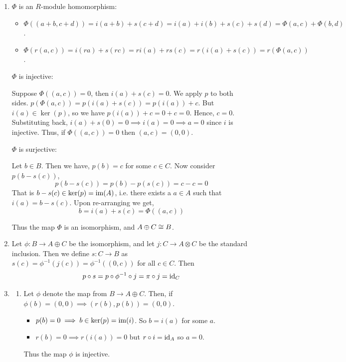\documentclass[Notebook.tex]{subfiles}
\begin{document}
\begin{solution}
    \bbni
    \begin{enumerate}
        \item $\Phi$ is an $R$-module homomorphism: 
        \begin{itemize}
            \item $\Phi((a+b, c+d)) = i(a+b) + s(c+d) = i(a) + i(b) + s(c) + s(d) = \Phi(a,c) + \Phi(b, d)$.
            \item $\Phi(r(a, c)) = i(ra) + s(rc) = ri(a) + rs(c) = r(i(a) + s(c)) = r(\Phi(a,c))$.
        \end{itemize}

        $\Phi$ is injective: 

        Suppose $\Phi((a,c)) = 0$, then $i(a) + s(c) = 0$. We apply $p$ to both sides. $p(\Phi(a,c)) =p(i(a) + s(c)) = p(i(a)) + c$. But $i(a) \in \ker(p)$, so we have $p(i(a)) + c = 0 + c = 0$. Hence, $c =0$. Substituting back, $i(a) + s(0) = 0 \implies i(a) = 0 \implies a = 0$ since $i$ is injective. Thus, if $\Phi((a,c)) = 0$ then $(a,c) = (0,0)$. 

        $\Phi$ is surjective: 

        Let $b \in B$. Then we have, $p(b) = c$ for some $c \in C$. Now consider $p(b - s(c))$, 
        \[p(b - s(c)) = p(b) - p(s(c)) = c - c = 0\]
        That is $b - s(c) \in \ker(p) = \operatorname{im}(A)$, i.e. there exists a $a \in A$ such that $i(a) = b - s(c)$. Upon re-arranging we get,
        \[b = i(a) + s(c) = \Phi((a, c))\] 

        Thus the map $\Phi$ is an isomorphism, and $A \oplus C \cong B$. 

        \item Let $\phi: B \to A \oplus C$ be the isomorphism, and let $j: C \to A \otimes C$ be the standard inclusion. Then we define $s: C \to B$ as $s(c) = \phi^{-1}(j(c))= \phi^{-1}((0,c))$ for all $c \in C$. Then 
        \[p \circ s = p \circ \phi^{-1} \circ j = \pi \circ j = \operatorname{id}_C\]
        
        \item \begin{enumerate}
            \item Let $\phi$ denote the map from $B \to A \oplus C$. Then, if $\phi(b) = (0, 0) \implies (r(b), p(b)) = (0, 0)$.
            
            \begin{itemize}
                \item $p(b) = 0 \implies b \in \ker(p) = \operatorname{im}(i)$. So $b  = i(a)$ for some $a$. 
                \item $r(b) =  0 \implies r(i(a)) = 0$ but $r \circ i = \operatorname{id}_A$ so $a = 0$. 
            \end{itemize}
            Thus the map $\phi$ is injective. 


\end{enumerate}
\end{enumerate}
\end{solution}
\end{document}
